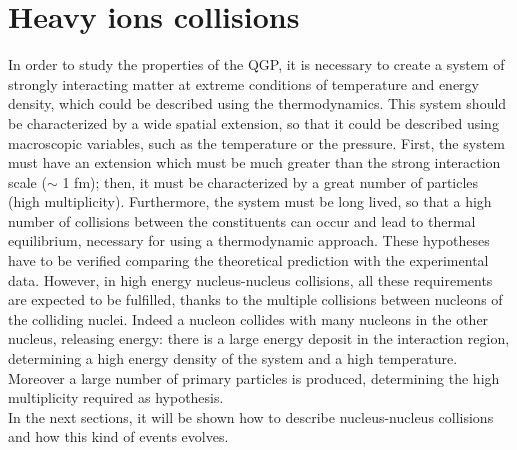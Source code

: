 \section{Heavy ions collisions}
In order to study the properties of the QGP, it is necessary to create a system of strongly interacting matter at extreme conditions of temperature and energy density, which could be described using the thermodynamics. This system should be characterized by a wide spatial extension, so that it could be described using macroscopic variables, such as the temperature or the pressure. First, the system must have an extension which must be much greater than the strong interaction scale ($\sim$ 1 fm); then, it must be characterized by a great number of particles (high multiplicity). Furthermore, the system must be long lived, so that a high number of collisions between the constituents can occur and lead to thermal equilibrium, necessary for using a thermodynamic approach. These hypotheses have to be verified comparing the theoretical prediction with the experimental data. However, in high energy nucleus-nucleus collisions, all these requirements are expected to be fulfilled, thanks to the multiple collisions between nucleons of the colliding nuclei. Indeed a nucleon collides with many nucleons in the other nucleus, releasing energy: there is a large energy deposit in the interaction region, determining a high energy density of the system and a high temperature. Moreover a large number of primary particles is produced, determining the high multiplicity required as hypothesis.\\
In the next sections, it will be shown how to describe nucleus-nucleus collisions and how this kind of events evolves.
%

